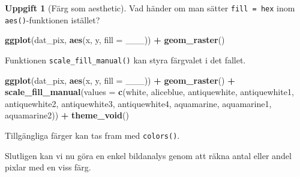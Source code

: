 \documentclass[
]{book}
\newenvironment{Shaded}{\begin{snugshade}}{\end{snugshade}}
\newcommand{\AttributeTok}[1]{\textcolor[rgb]{0.13,0.29,0.53}{#1}}
\newcommand{\FunctionTok}[1]{\textcolor[rgb]{0.13,0.29,0.53}{\textbf{#1}}}
\newcommand{\NormalTok}[1]{#1}
\newcommand{\OtherTok}[1]{\textcolor[rgb]{0.56,0.35,0.01}{#1}}
\newcommand{\SpecialCharTok}[1]{\textcolor[rgb]{0.81,0.36,0.00}{\textbf{#1}}}
\newcommand{\StringTok}[1]{\textcolor[rgb]{0.31,0.60,0.02}{#1}}
\theoremstyle{definition}
\theoremstyle{definition}
\theoremstyle{definition}
\newtheorem{exercise}{Uppgift}[chapter]
\theoremstyle{definition}
\theoremstyle{remark}
\begin{document}
\begin{exercise}[Färg som aesthetic]
Vad händer om man sätter \texttt{fill\ =\ hex} inom \texttt{aes()}-funktionen istället?

\begin{Shaded}
\begin{Highlighting}[]
\FunctionTok{ggplot}\NormalTok{(dat\_pix, }\FunctionTok{aes}\NormalTok{(x, y, }\AttributeTok{fill =}\NormalTok{ \_\_\_)) }\SpecialCharTok{+}
  \FunctionTok{geom\_raster}\NormalTok{()}
\end{Highlighting}
\end{Shaded}

Funktionen \texttt{scale\_fill\_manual()} kan styra färgvalet i det fallet.

\begin{Shaded}
\begin{Highlighting}[]
\FunctionTok{ggplot}\NormalTok{(dat\_pix, }\FunctionTok{aes}\NormalTok{(x, y, }\AttributeTok{fill =}\NormalTok{ \_\_\_)) }\SpecialCharTok{+}
  \FunctionTok{geom\_raster}\NormalTok{() }\SpecialCharTok{+}
  \FunctionTok{scale\_fill\_manual}\NormalTok{(}\AttributeTok{values =} \FunctionTok{c}\NormalTok{(}\StringTok{\textquotesingle{}white\textquotesingle{}}\NormalTok{, }\StringTok{\textquotesingle{}aliceblue\textquotesingle{}}\NormalTok{, }
                               \StringTok{\textquotesingle{}antiquewhite\textquotesingle{}}\NormalTok{, }\StringTok{\textquotesingle{}antiquewhite1\textquotesingle{}}\NormalTok{, }
                               \StringTok{\textquotesingle{}antiquewhite2\textquotesingle{}}\NormalTok{, }\StringTok{\textquotesingle{}antiquewhite3\textquotesingle{}}\NormalTok{, }
                               \StringTok{\textquotesingle{}antiquewhite4\textquotesingle{}}\NormalTok{, }\StringTok{\textquotesingle{}aquamarine\textquotesingle{}}\NormalTok{, }
                               \StringTok{\textquotesingle{}aquamarine1\textquotesingle{}}\NormalTok{, }\StringTok{\textquotesingle{}aquamarine2\textquotesingle{}}\NormalTok{)) }\SpecialCharTok{+}
  \FunctionTok{theme\_void}\NormalTok{()}
\end{Highlighting}
\end{Shaded}

Tillgängliga färger kan tas fram med \texttt{colors()}.
\end{exercise}

Slutligen kan vi nu göra en enkel bildanalys genom att räkna antal eller andel pixlar med en viss färg.

\begin{Shaded}
\end{Shaded}
\end{document}
